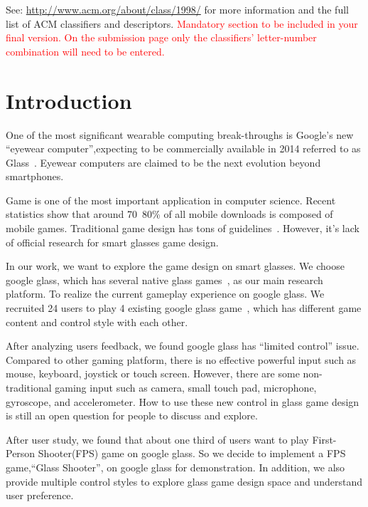 \documentclass{sigchi}
\begin{document}


See: \url{http://www.acm.org/about/class/1998/}
for more information and the full list of ACM classifiers
and descriptors. 
\textcolor{red}{Mandatory section to be included in your
final version. On the submission page only the classifiers'
letter-number combination will need to be entered.}

\section{Introduction}
One of the most significant wearable computing break-throughs is Google's new ``eyewear computer'',expecting to be commercially available in 2014 referred to as Glass~\cite{glass}.
Eyewear computers are claimed to be the next evolution beyond smartphones. 

Game is one of the most important application in computer science. Recent statistics show that around 70~80\% of all mobile downloads is composed of mobile games\cite{statistics,infographic}. Traditional game design has tons of guidelines~\cite{videogame,mobilegame,bodygame,gameflow,argame,wearable}. However, it's lack of official research for smart glasses game design.

In our work, we want to explore the game design on smart glasses. We choose google glass, which has  several native glass games~\cite{minigame}, as our main research platform. To realize the current gameplay experience on google glass. We recruited 24 users to play 4 existing google glass game~\cite{minigame}, which has different game content and control style with each other. 

After analyzing users feedback, we found google glass has ``limited control'' issue. Compared to other gaming platform, there is no effective powerful input such as mouse, keyboard, joystick or touch screen. However, there are some non-traditional gaming input such as camera, small touch pad, microphone, gyroscope, and accelerometer. How to use these new control in glass game design is still an open question for people to discuss and explore. 

After user study, we found that about one third of users want to play First-Person Shooter(FPS) game on google glass. So we decide to implement a FPS game,``Glass Shooter'', on google glass for demonstration. In addition, we also provide multiple control styles to explore glass game design space and understand user preference.
\end{document}
